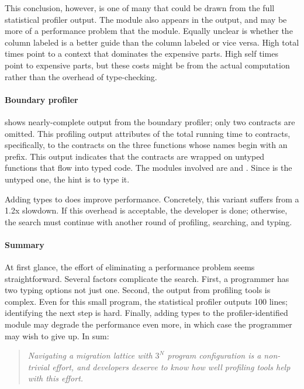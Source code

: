 This conclusion, however, is one of many that could be drawn from the full
statistical profiler output.  The  module also appears in the output,
and may be more of a performance problem that the  module.  Equally
unclear is whether the column labeled  is a better guide than
the column labeled  or vice versa.  High
total times point to a context that dominates the expensive parts.  High self
times point to expensive parts, but these costs might be from the actual
computation rather than the overhead of type-checking.

\paragraph{Boundary profiler}  shows nearly-complete
output from the boundary profiler; only two contracts are omitted.  This
profiling output attributes  of the total running time to
contracts, specifically, to the contracts on the three functions whose names
begin with an  prefix.
This output indicates that the contracts are
wrapped on untyped functions that flow into typed code. The modules involved are
 and .  Since  is the untyped one, the hint is to
type it.

Adding types to  does improve performance. Concretely, this variant
suffers from a 1.2x slowdown.  If this overhead is acceptable, the developer is
done; otherwise, the search must continue with another round of
profiling, searching, and typing.


\paragraph{Summary}

At first glance, the effort of eliminating a performance problem seems
straightforward. Several factors complicate the search. First, a
programmer has two typing options not just one. Second, the output from
profiling tools is complex. Even for this small program, the statistical
profiler outputs 100 lines;
identifying the next step is hard. Finally, adding types to the
profiler-identified module may degrade the performance even more, in which case
the programmer may wish to give up. In sum:

\begin{quote} \em
Navigating a migration lattice with
$3^N$ program configuration is a non-trivial effort, and developers deserve to
know how well profiling tools help with this effort.
\end{quote}

